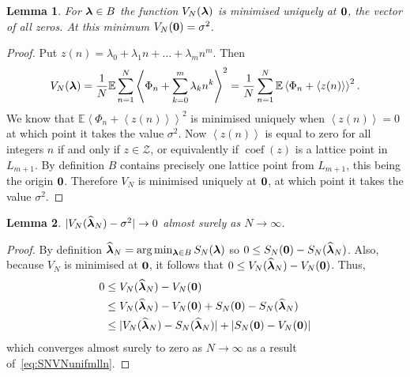 \documentclass[aap,preprint]{imsart}
\newcommand{\expect}{{\mathbb E}}
\newcommand{\fracpart}[1]{\left\langle #1 \right\rangle}
\newcommand{\sabs}[1]{\vert #1 \vert}
\newtheorem{lemma}{Lemma}
\newcommand{\coef}{\operatorname{coef}}
\begin{document}
\begin{lemma}\label{lem:ES_Nminimisedzero}
For $\boldsymbol{\lambda} \in B$ the function $V_N(\boldsymbol{\lambda})$ is minimised uniquely at $\boldsymbol{0}$, the vector of all zeros.  At this minimum $V_N(\boldsymbol{0}) = \sigma^2$.
\end{lemma}
\begin{proof}
Put $z(n) = \lambda_0 + \lambda_1 n + \dots + \lambda_m n^m$.  Then
\begin{align*}
V_N(\lambdabf) = \frac{1}{N}\expect\sum_{n=1}^{N}\fracpart{ \Phi_n + \sum_{k=0}^m{\lambda_k n^k} }^2 = \frac{1}{N}\sum_{n=1}^{N}\expect\fracpart{ \Phi_n + \fracpart{z(n)} }^2.
\end{align*}
We know that $\expect\fracpart{ \Phi_n + \fracpart{z(n)} }^2$ is minimised uniquely when $\fracpart{z(n)} = 0$ at which point it takes the value $\sigma^2$. Now $\fracpart{z(n)}$ is equal to zero for all integers $n$ if and only if $z \in \mathcal{Z}$, or equivalently if $\coef(z)$ is a lattice point in $L_{m+1}$. By definition $B$ contains precisely one lattice point from $L_{m+1}$, this being the origin $\boldsymbol{0}$. Therefore $V_N$ is minimised uniquely at $\boldsymbol{0}$, at which point it takes the value $\sigma^2$.
\end{proof}

\begin{lemma} \label{lem:ESNconv}
$\sabs{V_N(\widehat{\lambdabf}_N) - \sigma^2} \rightarrow 0$ almost surely as $N \rightarrow \infty$.
\end{lemma}
\begin{proof}
By definition $\widehat{\boldsymbol{\lambda}}_N =\arg\min_{\boldsymbol{\lambda}\in B} S_N(\boldsymbol{\lambda})$ so $0 \leq S_{N}(\boldsymbol{0}) - S_N(\widehat{\boldsymbol{\lambda}}_N)$.  Also, because $V_N$ is minimised at $\boldsymbol{0}$, it follows that $0 \leq V_N(\widehat{\boldsymbol{\lambda}}_N) - V_N(\boldsymbol{0})$.  Thus,
\begin{align*}
0 &\leq V_N(\widehat{\lambdabf}_N) - V_N(\zerobf) \\
 &\leq V_N(\widehat{\lambdabf}_N) - V_N(\zerobf) + S_{N}(\zerobf) - S_N(\widehat{\lambdabf}_N)   \\
&\leq \sabs{ V_N(\widehat{\lambdabf}_N) - S_N(\widehat{\lambdabf}_N) } + \sabs{ S_{N}(\zerobf) - V_N(\zerobf) }
\end{align*}
which converges almost surely to zero as $N\rightarrow\infty$ as a result of~\eqref{eq:SNVNunifmlln}.
\end{proof}
\end{document}
